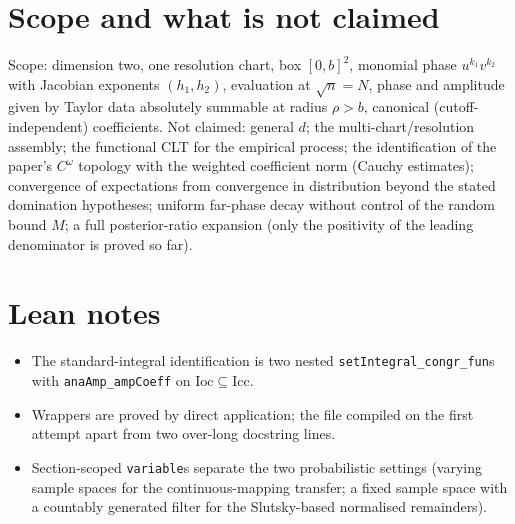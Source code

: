 \documentclass[11pt]{article}
\begin{document}
\section{Scope and what is not claimed}
Scope: dimension two, one resolution chart, box $[0,b]^2$, monomial phase $u^{k_1}v^{k_2}$ with
Jacobian exponents $(h_1,h_2)$, evaluation at $\sqrt n=N$, phase and amplitude given by Taylor data
absolutely summable at radius $\rho>b$, canonical (cutoff-independent) coefficients. Not claimed:
general $d$; the multi-chart/resolution assembly; the functional CLT for the empirical process; the
identification of the paper's $C^\omega$ topology with the weighted coefficient norm (Cauchy
estimates); convergence of expectations from convergence in distribution beyond the stated
domination hypotheses; uniform far-phase decay without control of the random bound $M$; a full
posterior-ratio expansion (only the positivity of the leading denominator is proved so far).

\section{Lean notes}
\begin{itemize}
\item The standard-integral identification is two nested \texttt{setIntegral\_congr\_fun}s with
\texttt{anaAmp\_ampCoeff} on $\mathrm{Ioc}\subseteq\mathrm{Icc}$.
\item Wrappers are proved by direct application; the file compiled on the first attempt apart from
two over-long docstring lines.
\item Section-scoped \texttt{variable}s separate the two probabilistic settings (varying sample
spaces for the continuous-mapping transfer; a fixed sample space with a countably generated filter
for the Slutsky-based normalised remainders).
\end{itemize}
\end{document}

